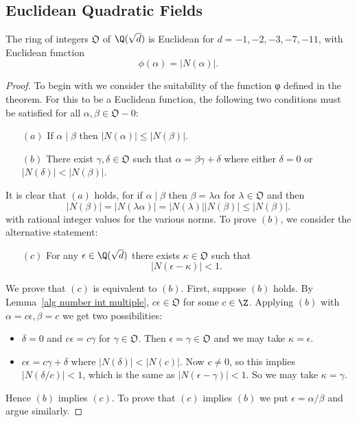 \subsection{Euclidean Quadratic Fields}
\begin{theorem}\label{int ring ED}
The ring of integers $\mathfrak{O}$ of $\Q(\sqrt{d})$ is Euclidean for $d=-1,-2,-3,-7,-11$, with Euclidean function
\[\phi(\alpha)=|N(\alpha)|.\]
\end{theorem}
\begin{proof}
To begin with we consider the suitability of the function φ defined
in the theorem. For this to be a Euclidean function, the following two
conditions must be satisfied for all $\alpha,\beta\in\mathfrak{O}-0$:
\begin{itemize}
\item[$(a)$] If $\alpha\mid\beta$ then $|N(\alpha)|\leq|N(\beta)|$.
\item[$(b)$] There exist $\gamma,\delta\in\mathfrak{O}$ such that $\alpha=\beta\gamma+\delta$ where either $\delta=0$ or $|N(\delta)|<|N(\beta)|$.
\end{itemize}
It is clear that $(a)$ holds, for if $\alpha\mid\beta$ then $\beta=\lambda\alpha$ for $\lambda\in\mathfrak{O}$ and then
\[|N(\beta)|=|N(\lambda\alpha)|=|N(\lambda)||N(\beta)|\leq|N(\beta)|.\]
with rational integer values for the various norms. To prove $(b)$, we consider the alternative statement:
\begin{itemize}
\item[$(c)$] For any $\epsilon\in\Q(\sqrt{d})$ there exists $\kappa\in\mathfrak{O}$ such that
\[|N(\epsilon-\kappa)|<1.\]
\end{itemize}
We prove that $(c)$ is equivalent to $(b)$. First, suppose $(b)$ holds. By Lemma~\ref{alg number int multiple}, $c\epsilon\in\mathfrak{O}$ for some $c\in\Z$. Applying $(b)$ with $\alpha=c\epsilon,\beta=c$ we get two possibilities:
\begin{itemize}
\item $\delta=0$ and $c\epsilon=c\gamma$ for $\gamma\in\mathfrak{O}$. Then $\epsilon=\gamma\in\mathfrak{O}$ and we may take $\kappa=\epsilon$.
\item $c\epsilon=c\gamma+\delta$ where $|N(\delta)|<|N(c)|$. Now $c\neq0$, so this implies $|N(\delta/c)|<1$, which is the same as $|N(\epsilon-\gamma)|<1$. So we may take $\kappa=\gamma$.
\end{itemize}
Hence $(b)$ implies $(c)$. To prove that $(c)$ implies $(b)$ we put $\epsilon=\alpha/\beta$ and argue similarly.\par

\end{proof}

